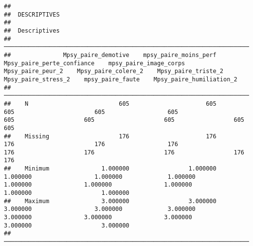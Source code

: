 \documentclass[
]{article}
\begin{document}
\begin{verbatim}
## 
##  DESCRIPTIVES
## 
##  Descriptives                                                                                                                                                                                                                                                  
##  ───────────────────────────────────────────────────────────────────────────────────────────────────────────────────────────────────────────────────────────────────────────────────────────────────────────────────────────────────────────────────────────── 
##               Mpsy_paire_demotive    mpsy_paire_moins_perf    Mpsy_paire_perte_confiance    mpsy_paire_image_corps    Mpsy_paire_peur_2    Mpsy_paire_colere_2    Mpsy_paire_triste_2    Mpsy_paire_stress_2    mpsy_paire_faute    Mpsy_paire_humiliation_2   
##  ───────────────────────────────────────────────────────────────────────────────────────────────────────────────────────────────────────────────────────────────────────────────────────────────────────────────────────────────────────────────────────────── 
##    N                          605                      605                           605                       605                  605                    605                    605                    605                 605                         605   
##    Missing                    176                      176                           176                       176                  176                    176                    176                    176                 176                         176   
##    Minimum               1.000000                 1.000000                      1.000000                  1.000000             1.000000               1.000000               1.000000               1.000000            1.000000                    1.000000   
##    Maximum               3.000000                 3.000000                      3.000000                  3.000000             3.000000               3.000000               3.000000               3.000000            3.000000                    3.000000   
##  ─────────────────────────────────────────────────────────────────────────────────────────────────────────────────────────────────────────────────────────────────────────────────────────────────────────────────────────────────────────────────────────────
\end{verbatim}
\end{document}
